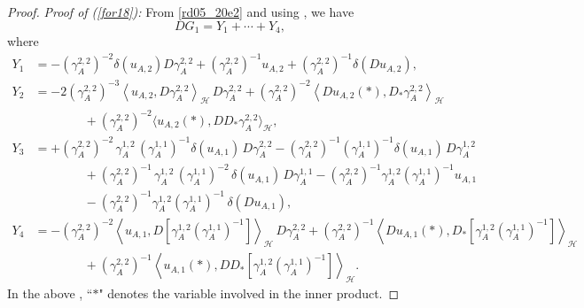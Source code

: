\documentclass[12pt,a4paper]{article}
\newcommand{\HH}{\mathcal{H}}
\newcommand{\<}{\langle}
\renewcommand{\>}{\rangle}
\begin{document}
\begin{proof}
 \noindent
 {\it Proof of (\ref{for18}):} 
  From \eqref{rd05_20e2} and using \cite[Proposition 1.3.8]{nualart2006}, we have
  $$
  DG_1 = Y_1 + \cdots + Y_4,
  $$
  where
  \begin{align*}
    Y_1&=  -(\gamma_{A} ^{2,2})^{-2} \delta(u_{A,2}) D\gamma_A^{2,2}+(\gamma_{A} ^{2,2})^{-1}  u_{A,2} +
    (\gamma_{A} ^{2,2})^{-1}  \delta(Du_{A,2} ), \\[6pt]
    Y_2&= -2
    (\gamma_{A} ^{2,2})^{-3}  \left\langle u_{A,2} ,D\gamma_A^{2,2} \right\rangle_\HH\, D\gamma_A^{2,2} 
    + (\gamma_{A} ^{2,2})^{-2}   \left\langle Du_{A,2} (*),D_*\gamma_A^{2,2} \right\rangle_\HH \\
    &\qquad\qquad +
    (\gamma_{A} ^{2,2})^{-2}   \langle u_{A,2} (*),DD_*\gamma_A^{2,2} \rangle_\HH , \\[6pt]
  Y_3& =  +(\gamma_{A} ^{2,2})^{-2} \,  \gamma_{A} ^{1,2}\,
     ( \gamma_{A} ^{1,1})^{-1}\delta(u_{A,1} )\,  D\gamma_A^{2,2} 
     -(\gamma_{A} ^{2,2})^{-1}  
     ( \gamma_{A} ^{1,1})^{-1}\delta(u_{A,1} )\,  D\gamma_{A} ^{1,2} \\
     &\qquad\qquad + ( \gamma_{A} ^{2,2})^{-1}\, \gamma_{A} ^{1,2}\, ( \gamma_{A} ^{1,1})^{-2}\, \delta(u_{A,1} ) \, D\gamma_A^{1,1} 
      -(\gamma_{A} ^{2,2})^{-1}   \gamma_{A} ^{1,2}
     ( \gamma_{A} ^{1,1})^{-1}u_{A,1} \\
     &\qquad\qquad -     (\gamma_{A} ^{2,2})^{-1}   \gamma_{A} ^{1,2}
     ( \gamma_{A} ^{1,1})^{-1} \, \delta(D u_{A,1}) , \\[6pt]
   Y_4  &= - (\gamma_{A} ^{2,2})^{-2} \left\langle u_{A,1} ,D\left[  \gamma_{A} ^{1,2}
     ( \gamma_{A} ^{1,1})^{-1} \right] \right\rangle_\HH \, D\gamma_A^{2,2} 
     + (\gamma_{A} ^{2,2})^{-1} 
    \left \langle Du_{A,1}(*) ,D_*[  \gamma_{A} ^{1,2}
     ( \gamma_{A} ^{1,1})^{-1} ] \right\rangle_\HH \\
    &\qquad\qquad +(\gamma_{A} ^{2,2})^{-1} 
    \left \langle u_{A,1}(*) ,DD_*[  \gamma_{A} ^{1,2}
     ( \gamma_{A} ^{1,1})^{-1} ] \right\rangle_\HH .
  \end{align*}
In the above , ``$*$" denotes the variable involved in the inner product. 


\end{proof}
\end{document}
